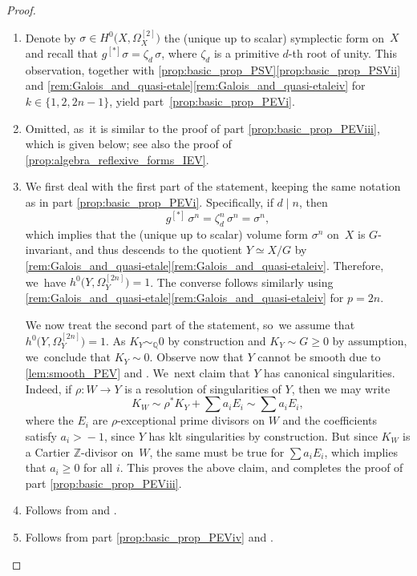 \documentclass[10pt]{amsart}
\newcommand{\skpt}{\par\smallskip\noindent}
\theoremstyle{plain}
\theoremstyle{definition}
\newcommand{\Z}{\mathbb{Z}}
\newcommand{\Q}{\mathbb{Q}}
\begin{document}
\skpt
\begin{proof}
\begin{enumerate}
\item
Denote by $\sigma \in H^0 \bigl(X, \Omega^{[2]}_X \bigr)$ the (unique up to scalar) symplectic form on~$X$ and recall that $g^{[*]} \sigma = \zeta_d \,\sigma$, where $\zeta_d$ is a primitive $d$-th root of unity.
This observation, together with \autoref{prop:basic_prop_PSV}\eqref{prop:basic_prop_PSVii} and \autoref{rem:Galois_and_quasi-etale}\eqref{rem:Galois_and_quasi-etaleiv} for $k \in \{1, 2, 2n-1 \}$, yield part~\eqref{prop:basic_prop_PEVi}.

\item
Omitted, as~it is similar to the proof of part \eqref{prop:basic_prop_PEViii}, which is given below; see also the proof of \autoref{prop:algebra_reflexive_forms_IEV}.

\item
We first deal with the first part of the statement, keeping the same notation as in part \eqref{prop:basic_prop_PEVi}. Specifically, if $d \mid n$, then
\[
g^{[*]} \,\sigma^n = \zeta_d^n \,\sigma^n = \sigma^n,
\]
which implies that the (unique up to scalar) volume form $\sigma^n$ on~$X$ is $G$\nobreakdash-invariant, and thus descends to the quotient $Y \simeq X / G$ by \autoref{rem:Galois_and_quasi-etale}\eqref{rem:Galois_and_quasi-etaleiv}. Therefore, we~have $h^0 \bigl(Y, \Omega^{[2n]}_Y \bigr) = 1$. The converse follows similarly using \autoref{rem:Galois_and_quasi-etale}\eqref{rem:Galois_and_quasi-etaleiv} for $p=2n$.

We now treat the second part of the statement, so~we assume that $h^0 \bigl(Y, \Omega^{[2n]}_Y \bigr) = 1$. As $K_Y \sim_\Q 0$ by construction and $K_Y \sim G \geq 0$ by assumption, we~conclude that $K_Y \sim 0$. Observe now that $Y$ cannot be smooth due to \autoref{lem:smooth_PEV} and \cite[Prop.\,2.8]{OS11a}. We~next claim that $Y$ has canonical singularities. Indeed, if $\rho \colon W \to Y$ is a resolution of singularities of $Y$, then we may write
\[
K_W \sim \rho^* K_Y + \sum a_i E_i \sim \sum a_i E_i,
\]
where the $E_i$ are $\rho$-exceptional prime divisors on $W$ and the coefficients satisfy \hbox{$a_i \!>\! -1$}, since $Y$ has klt singularities by construction. But since $K_W$ is a Cartier $\Z$-divisor on~$W$, the same must be true for $\sum a_i E_i$, which implies that $a_i \geq 0$ for all $i$. This proves the above claim, and completes the proof of part \eqref{prop:basic_prop_PEViii}.

\item
Follows from \cite[Lem.\,4.6]{BL22} and \cite[Lem.\,5.3]{Graf18}.

\item
Follows from part \eqref{prop:basic_prop_PEViv} and \cite[Lem.\,3.4]{MO67}.\qedhere
\end{enumerate}
\end{proof}
\end{document}
